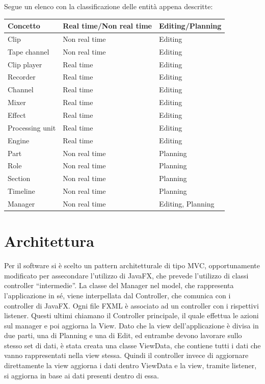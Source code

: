 \documentclass[a4paper,12pt]{report}
\begin{document}
Segue un elenco con la classificazione delle entità appena descritte:
\begin{center}
\begin{longtable}{| m{10em} | m{5cm} | m{4cm} |} 
 \hline
 \textbf{Concetto} & \textbf{Real time/Non real time} & \textbf{Editing/Planning} \\ [0.5ex] 
 \hline
 Clip & Non real time & Editing \\ 
 \hline
 Tape channel & Non real time & Editing \\
 \hline
 Clip player & Real time & Editing \\
 \hline
 Recorder & Real time & Editing \\
 \hline
 Channel & Real time & Editing \\ 
 \hline
 Mixer & Real time & Editing \\
 \hline 
 Effect & Real time & Editing \\
 \hline
 Processing unit & Real time & Editing \\
 \hline
 Engine & Real time & Editing \\
 \hline
 Part & Non real time & Planning \\
 \hline
 Role & Non real time & Planning \\
\hline
 Section & Non real time & Planning \\
\hline
 Timeline & Non real time & Planning \\
\hline
 Manager & Non real time & Editing, Planning \\
\hline
\end{longtable}
\end{center}

\section{Architettura}
Per il software si è scelto un pattern architetturale di tipo MVC, opportunamente modificato per assecondare l’utilizzo di JavaFX, che prevede l’utilizzo di classi controller “intermedie”. La classe del Manager nel model, che rappresenta l’applicazione in sé, viene interpellata dal Controller, che comunica con i controller di JavaFX. Ogni file FXML è associato ad un controller con i rispettivi listener. Questi ultimi chiamano il Controller principale, il quale effettua le azioni sul manager e poi aggiorna la View. Dato che la view dell’applicazione è divisa in due parti, una di Planning e una di Edit, ed entrambe devono lavorare sullo stesso set di dati, è stata creata una classe ViewData, che contiene tutti i dati che vanno rappresentati nella view stessa. Quindi il controller invece di aggiornare direttamente la view aggiorna i dati dentro ViewData e la view, tramite listener, si aggiorna in base ai dati presenti dentro di essa.
\end{document}
